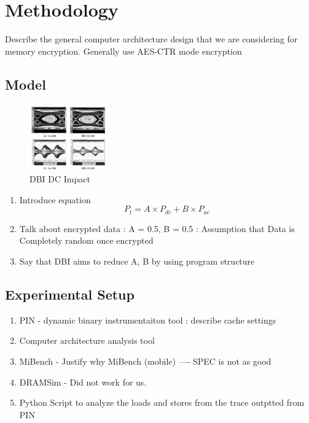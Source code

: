 \section{Methodology}
\label{sec-methodology}



Describe the general computer architecture design that we are considering for
memory encryption. Generally use AES-CTR mode encryption

\subsection{Model}

\begin{figure}
  \centering
  \includegraphics[width=0.3\textwidth]{figs/dbi-dc}
  \caption{DBI DC Impact \cite{hollis}}
  \label{fig:dbi-dc}
\end{figure}

\begin{enumerate}
  \item Introduce equation
    $$ P_t = A \times P_{dc} + B \times P_{ac}$$
  \item Talk about encrypted data : A = 0.5, B = 0.5 : Assumption that Data is
    Completely random once encrypted
  \item Say that DBI aims to reduce A, B by using program structure
\end{enumerate}

\subsection{Experimental Setup}
\begin{enumerate}
  \item PIN - dynamic binary instrumentaiton tool : describe cache settings
  \item Computer architecture analysis tool
  \item MiBench - Justify why MiBench (mobile) ---- SPEC is not as good
  \item DRAMSim - Did not work for us.
  \item Python Script to analyze the loads and stores from the trace outptted
    from PIN
\end{enumerate}
